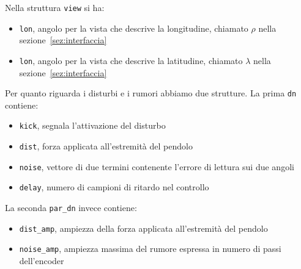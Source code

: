 Nella struttura \texttt{view} si ha:
\begin{itemize}
	\item \texttt{lon}, angolo per la vista che descrive la longitudine, chiamato $\rho$ nella sezione~\ref{sez:interfaccia}
	\item \texttt{lon}, angolo per la vista che descrive la latitudine, chiamato $\lambda$ nella sezione~\ref{sez:interfaccia}
\end{itemize}
Per quanto riguarda i disturbi e i rumori abbiamo due strutture. La prima \texttt{dn} contiene:
\begin{itemize}
	\item \texttt{kick}, segnala l'attivazione del disturbo
	\item \texttt{dist}, forza applicata all'estremità del pendolo
	\item \texttt{noise}, vettore di due termini contenente l'errore di lettura sui due angoli
	\item \texttt{delay}, numero di campioni di ritardo nel controllo
\end{itemize}
La seconda \texttt{par\_dn} invece contiene:
\begin{itemize}
	\item \texttt{dist\_amp}, ampiezza della forza applicata all'estremità del pendolo
	\item \texttt{noise\_amp}, ampiezza massima del rumore espressa in numero di passi dell'encoder
\end{itemize}



\FloatBarrier